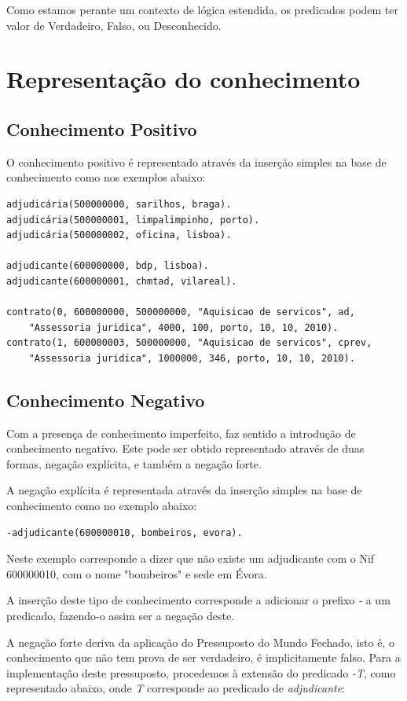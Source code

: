 \documentclass[a4paper]{report}
\begin{document}
Como estamos perante um contexto de lógica estendida, os predicados podem ter
valor de Verdadeiro, Falso, ou Desconhecido.

\section{Representação do conhecimento}

\subsection{Conhecimento Positivo}
O conhecimento positivo é representado através da inserção simples na base de
conhecimento como nos exemplos abaixo:

\begin{verbatim}
adjudicária(500000000, sarilhos, braga).
adjudicária(500000001, limpalimpinho, porto).
adjudicária(500000002, oficina, lisboa).

adjudicante(600000000, bdp, lisboa).
adjudicante(600000001, chmtad, vilareal).

contrato(0, 600000000, 500000000, "Aquisicao de servicos", ad, 
    "Assessoria juridica", 4000, 100, porto, 10, 10, 2010).
contrato(1, 600000003, 500000000, "Aquisicao de servicos", cprev, 
    "Assessoria juridica", 1000000, 346, porto, 10, 10, 2010).
\end{verbatim}

\pagebreak
\subsection{Conhecimento Negativo}
Com a presença de conhecimento imperfeito, faz sentido a introdução de
conhecimento negativo. Este pode ser obtido representado através de duas formas,
negação explícita, e também a negação forte.

A negação explícita é representada através da inserção simples na base de
conhecimento como no exemplo abaixo:

\begin{verbatim}
-adjudicante(600000010, bombeiros, evora).
\end{verbatim}

Neste exemplo corresponde a dizer que não existe um adjudicante com o Nif
600000010, com o nome "bombeiros" e sede em Évora.

A inserção deste tipo de conhecimento corresponde a adicionar o prefixo
\textit{-} a um predicado, fazendo-o assim ser a negação deste.

A negação forte deriva da aplicação do Pressuposto do Mundo Fechado, isto é, o
conhecimento que não tem prova de ser verdadeiro, é implicitamente falso. 
Para a implementação deste pressuposto, procedemos à extensão do predicado
\textit{-T}, como representado abaixo, onde \textit{T} corresponde ao predicado
de \textit{adjudicante}:
\end{document}
